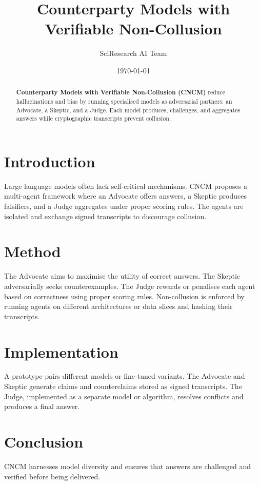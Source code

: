 \documentclass{article}
\title{Counterparty Models with Verifiable Non-Collusion}
\author{SciResearch AI Team}
\date{\today}
\begin{document}
\maketitle
\begin{abstract}
\textbf{Counterparty Models with Verifiable Non-Collusion (CNCM)} reduce
hallucinations and bias by running specialised models as adversarial
partners: an Advocate, a Skeptic, and a Judge. Each model produces,
challenges, and aggregates answers while cryptographic transcripts
prevent collusion.
\end{abstract}
\section{Introduction}
Large language models often lack self-critical mechanisms. CNCM proposes
a multi-agent framework where an Advocate offers answers, a Skeptic
produces falsifiers, and a Judge aggregates under proper scoring rules.
The agents are isolated and exchange signed transcripts to discourage
collusion.
\section{Method}
The Advocate aims to maximise the utility of correct answers. The
Skeptic adversarially seeks counterexamples. The Judge rewards or
penalises each agent based on correctness using proper scoring rules.
Non-collusion is enforced by running agents on different architectures
or data slices and hashing their transcripts.
\section{Implementation}
A prototype pairs different models or fine-tuned variants. The Advocate
and Skeptic generate claims and counterclaims stored as signed
transcripts. The Judge, implemented as a separate model or algorithm,
resolves conflicts and produces a final answer.
\section{Conclusion}
CNCM harnesses model diversity and ensures that answers are challenged
and verified before being delivered.
\end{document}
